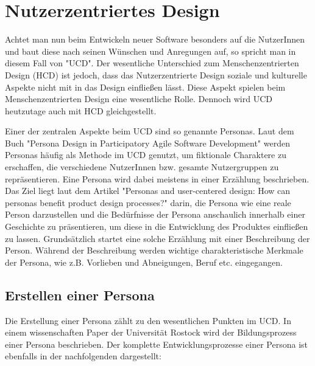 \section{Nutzerzentriertes Design}

Achtet man nun beim Entwickeln neuer Software besonders auf die NutzerInnen und baut diese nach seinen Wünschen und Anregungen auf, so spricht man in diesem Fall von "\acf{UCD}". Der wesentliche Unterschied zum Menschenzentrierten Design (\acs{HCD}) ist jedoch, dass das Nutzerzentrierte Design soziale und kulturelle Aspekte nicht mit in das Design einfließen lässt.\cite{hcd2:2021} Diese Aspekt spielen beim Menschenzentrierten Design eine wesentliche Rolle. Dennoch wird \acs{UCD} heutzutage auch mit HCD gleichgestellt.\cite{ucd1:2011}

Einer der zentralen Aspekte beim \acs{UCD} sind so genannte Personas. Laut dem Buch "Persona Design in Participatory Agile Software Development" werden Personas häufig als Methode im \acs{UCD} genutzt, um fiktionale Charaktere zu erschaffen, die verschiedene NutzerInnen bzw. gesamte Nutzergruppen zu repräsentieren.\cite{personaDesign:2020} Eine Persona wird dabei meistens in einer Erzählung beschrieben.\cite{ucd1:2011} Das Ziel liegt laut dem Artikel "Personas and user-centered design: How can personas benefit product design processes?" darin, die Persona wie eine reale Person darzustellen und die Bedürfnisse der Persona anschaulich innerhalb einer Geschichte zu präsentieren, um diese in die Entwicklung des Produktes einfließen zu lassen.\cite{ucd1:2011}
Grundsätzlich startet eine solche Erzählung mit einer Beschreibung der Person.\cite{ucd1:2011} Während der Beschreibung werden wichtige charakteristische Merkmale der Persona, wie z.B. Vorlieben und Abneigungen, Beruf etc. eingegangen.\cite{ucd1:2011}

\subsection{Erstellen einer Persona}
Die Erstellung einer Persona zählt zu den wesentlichen Punkten im \acs{UCD}. In einem wissenschaften Paper der Universität Rostock wird der Bildungsprozess einer Persona beschrieben. Der komplette Entwicklungsprozesse einer Persona ist ebenfalls in der nachfolgenden  dargestellt:


